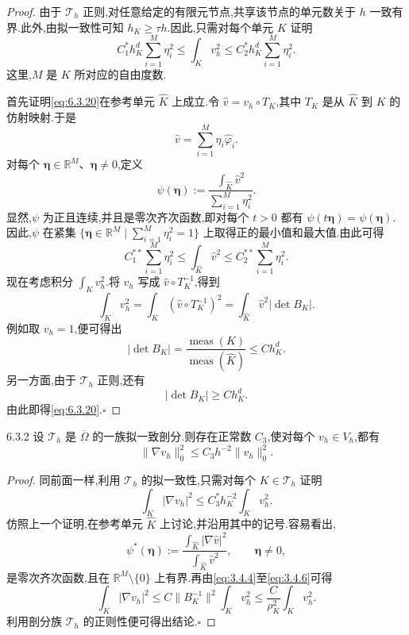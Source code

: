 \begin{proof}
由于 \(\mathcal T_h\) 正则,对任意给定的有限元节点,共享该节点的单元数关于 \(h\) 一致有界.此外,由拟一致性可知 \(h_K\ge\tau h\).因此,只需对每个单元 \(K\) 证明
\begin{equation}\label{eq:6.3.20}
  C_1^* h_K^d\sum_{i=1}^M\eta_i^2
    \le\int_K v_h^2\le C_2^* h_K^d\sum_{i=1}^M\eta_i^2.
\end{equation}
这里,\(M\) 是 \(K\) 所对应的自由度数.

首先证明\eqref{eq:6.3.20}在参考单元 \(\widehat K\) 上成立.令 \(\widehat v=v_h\circ T_K\),其中 \(T_K\) 是从 \(\widehat K\) 到 \(K\) 的仿射映射.于是
\[
  \widehat v=\sum_{i=1}^M\eta_i\widehat\varphi_i.
\]
对每个 \(\boldsymbol{\eta}\in\mathbb R^M\)、\(\boldsymbol{\eta}\ne0\),定义
\[
  \psi(\boldsymbol{\eta}):=\frac{\int_{\widehat K}\widehat v^2}{\sum_{i=1}^M\eta_i^2}.
\]
显然,\(\psi\) 为正且连续,并且是零次齐次函数,即对每个 \(t>0\) 都有 \(\psi(t\boldsymbol{\eta})=\psi(\boldsymbol{\eta})\).因此,\(\psi\) 在紧集 \(\{\boldsymbol{\eta}\in\mathbb R^M\mid\sum_{i=1}^M\eta_i^2=1\}\) 上取得正的最小值和最大值.由此可得
\[
  C_1^{**}\sum_{i=1}^M\eta_i^2\le\int_{\widehat K}\widehat v^2
     \le C_2^{**}\sum_{i=1}^M\eta_i^2.
\]
现在考虑积分 \(\int_K v_h^2\).将 \(v_h\) 写成 \(\widehat v\circ T_K^{-1}\),得到
\[
  \int_K v_h^2=\int_K(\widehat v\circ T_K^{-1})^2
    =\int_{\widehat K}\widehat v^2|\det B_K|.
\]
例如取 \(v_h=1\),便可得出
\[
  |\det B_K|=\frac{\operatorname{meas}(K)}{\operatorname{meas}(\widehat K)}\le Ch_K^d.
\]
另一方面,由于 \(\mathcal T_h\) 正则,还有
\[
  |\det B_K|\ge Ch_K^d.
\]
由此即得\eqref{eq:6.3.20}.\hfill\(\square\)
\end{proof}

\begin{proposition}[分片多项式的逆不等式]{6.3.2}
设 \(\mathcal T_h\) 是 \(\overline\Omega\) 的一族拟一致剖分.则存在正常数 \(C_3\),使对每个 \(v_h\in V_h\),都有
\begin{equation}\label{eq:6.3.21}
  \|\nabla v_h\|_0^2\le C_3h^{-2}\|v_h\|_0^2.
\end{equation}
\end{proposition}

\begin{proof}
同前面一样,利用 \(\mathcal T_h\) 的拟一致性,只需对每个 \(K\in\mathcal T_h\) 证明
\begin{equation}\label{eq:6.3.22}
  \int_K|\nabla v_h|^2\le C_3^*h_K^{-2}\int_Kv_h^2.
\end{equation}
仿照上一个证明,在参考单元 \(\widehat K\) 上讨论,并沿用其中的记号.容易看出,
\[
  \psi^*(\boldsymbol{\eta}):=
    \frac{\int_{\widehat K}|\nabla\widehat v|^2}{\int_{\widehat K}\widehat v^2},
    \qquad \boldsymbol{\eta}\ne0,
\]
是零次齐次函数,且在 \(\mathbb R^M\setminus\{0\}\) 上有界.再由\eqref{eq:3.4.4}至\eqref{eq:3.4.6}可得
\[
  \int_K|\nabla v_h|^2\le C\|B_K^{-1}\|^2\int_Kv_h^2
    \le\frac{C}{\rho_K^2}\int_Kv_h^2.
\]
利用剖分族 \(\mathcal T_h\) 的正则性便可得出结论.\hfill\(\square\)
\end{proof}


